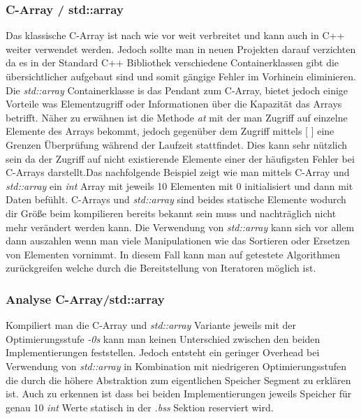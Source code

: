 \documentclass[MES,Master,ngerman]{twbook}%
\begin{document}
\subsubsection{C-Array / std::array}
Das klassische C-Array ist nach wie vor weit verbreitet und kann auch in C++ weiter verwendet werden. Jedoch sollte man in neuen Projekten darauf verzichten da es in der Standard C++ Bibliothek verschiedene Containerklassen gibt die übersichtlicher aufgebaut sind und somit gängige Fehler im Vorhinein eliminieren. Die \textit{std::array} Containerklasse is das Pendant zum C-Array, bietet jedoch einige Vorteile was Elementzugriff oder Informationen über die Kapazität das Arrays betrifft. Näher zu erwähnen ist die Methode \textit{at} mit der man Zugriff auf einzelne Elemente des Arrays bekommt, jedoch gegenüber dem Zugriff mittels [ ] eine Grenzen Überprüfung während der Laufzeit stattfindet. Dies kann sehr nützlich sein da der Zugriff auf nicht existierende Elemente einer der häufigsten Fehler bei C-Arrays darstellt.\newline\newline Das nachfolgende Beispiel zeigt wie man mittels C-Array und \textit{std::array} ein \textit{int} Array mit jeweils 10 Elementen mit 0 initialisiert und dann mit Daten befühlt. C-Arrays und \textit{std::array} sind beides statische Elemente wodurch dir Größe beim kompilieren bereits bekannt sein muss und nachträglich nicht mehr verändert werden kann. Die Verwendung von \textit{std::array} kann sich vor allem dann auszahlen wenn man viele Manipulationen wie das Sortieren oder Ersetzen von Elementen vornimmt. In diesem Fall kann man auf getestete Algorithmen zurückgreifen welche durch die Bereitstellung von Iteratoren möglich ist.


\begin{figure}[!htb]
	\begin{subfigure}[b]{0.5\textwidth}
		
		\label{fig:7}
	\end{subfigure}
	\begin{subfigure}[b]{0.5\textwidth}
		
		\label{fig:8}
	\end{subfigure}
\end{figure}

\subsubsection{Analyse C-Array/std::array}
Kompiliert man die C-Array und \textit{std::array} Variante jeweils mit der Optimierungsstufe \textit{-0s} kann man keinen Unterschied zwischen den beiden Implementierungen feststellen. Jedoch entsteht ein geringer Overhead bei Verwendung von \textit{std::array} in Kombination mit niedrigeren Optimierungsstufen die durch die höhere Abstraktion zum eigentlichen Speicher Segment zu erklären ist. Auch zu erkennen ist dass bei beiden Implementierungen jeweils Speicher für genau 10 \textit{int} Werte statisch in der \textit{.bss} Sektion reserviert wird.
\end{document}
